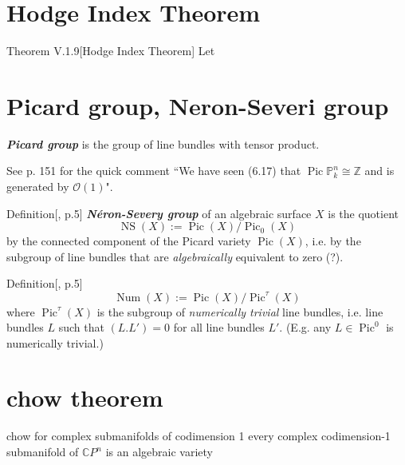 \section{Hodge Index Theorem}

\begin{thing4}{Theorem V.1.9}[Hodge Index Theorem]\label{prop:V.1.9}\leavevmode
Let
\end{thing4}

\section{Picard group, Neron-Severi group}

\begin{defn}[dani]\leavevmode
\textit{\textbf{Picard group}} is the group of line bundles with tensor product.
\end{defn}

\begin{remark}\leavevmode
See \cite{hart} p. 151 for the quick comment ``We have seen (6.17) that \(\operatorname{Pic}\mathbb{P}^n_k \cong\mathbb{Z}\) and is generated by \(\mathcal{O}(1)\)".
\end{remark}

\begin{thing4}{Definition}[\cite{huk}, p.5]\leavevmode
\textit{\textbf{Néron-Severy group}} of an algebraic surface \(X\) is the quotient
\[\operatorname{NS}(X):=\operatorname{Pic}(X) /\operatorname{Pic}_0(X)\]
by the connected component of the Picard variety \(\operatorname{Pic}(X)\), i.e. by the subgroup of line bundles that are \textit{algebraically} equivalent to zero (?).
\end{thing4}

\begin{thing4}{Definition}[\cite{huk}, p.5]\label{prop:}\leavevmode
\[\operatorname{Num}(X):=\operatorname{Pic}(X)/\operatorname{Pic}^\tau(X)\]
where \(\operatorname{Pic}^\tau(X)\) is the subgroup of \textit{numerically trivial} line bundles, i.e. line bundles \(L\) such that \((L.L')=0\) for all line bundles \(L'\). (E.g. any  \(L \in \operatorname{Pic}^0\) is numerically trivial.) 
\end{thing4}

\section{chow theorem}

\begin{thing6}{chow for complex submanifolds of codimension 1}\leavevmode
every complex codimension-1 submanifold of \(\mathbb{C}P^n\) is an algebraic variety
\end{thing6}

